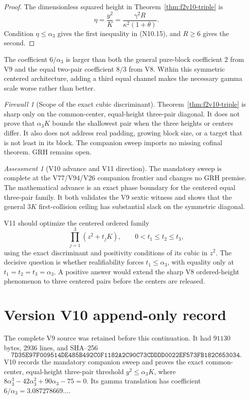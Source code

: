 \documentclass[11pt]{article}
\theoremstyle{definition}
\theoremstyle{remark}
\newtheorem{assessment}[theorem]{Assessment}
\newtheorem{firewall}[theorem]{Firewall}
\begin{document}
\begin{proof}
The dimensionless squared height in Theorem~\ref{thm:f2v10-triple} is
\[
 \eta=\frac{y^2}{K}
 =\frac{\gamma^2R}{\kappa^2(1+\theta)}.
 \tag{N10.17}
\]
Condition \(\eta\le\alpha_3\) gives the first inequality in
\textup{(N10.15)}, and \(R\ge6\) gives the second.
\end{proof}

The coefficient \(6/\alpha_3\) is larger than both the general pure-block
coefficient \(2\) from V9 and the equal two-pair coefficient \(8/3\) from
V8.  Within this symmetric centered architecture, adding a third equal
channel makes the necessary gamma scale worse rather than better.

\begin{firewall}[Scope of the exact cubic discriminant]
Theorem~\ref{thm:f2v10-triple} is sharp only on the common-center,
equal-height three-pair diagonal.  It does not prove that
\(\alpha_3K\) bounds the shallowest pair when the three heights or centers
differ.  It also does not address real padding, growing block size, or a
target that is not least in its block.  The companion sweep imports no
missing cofinal theorem.  GRH remains open.
\end{firewall}

\begin{assessment}[V10 advance and V11 direction]
The mandatory sweep is complete at the V77/V94/V26 companion frontier and
changes no GRH premise.  The mathematical advance is an exact phase
boundary for the centered equal three-pair family.  It both validates the
V9 sextic witness and shows that the general \(3K\) first-collision ceiling
has substantial slack on the symmetric diagonal.

V11 should optimize the centered ordered family
\[
 \prod_{j=1}^3(z^2+t_jK),
 \qquad 0<t_1\le t_2\le t_3,
 \tag{N10.18}
\]
using the exact discriminant and positivity conditions of its cubic in
\(z^2\).  The decisive question is whether realifiability forces
\(t_1\le\alpha_3\), with equality only at
\(t_1=t_2=t_3=\alpha_3\).  A positive answer would extend the sharp V8
ordered-height phenomenon to three centered pairs before the centers are
released.
\end{assessment}

\section*{Version V10 append-only record}
The complete V9 source was retained before this continuation.  It had
\(91130\) bytes, \(2936\) lines, and SHA--256
\[
 \texttt{7D35E97F009514DE485B492C0F1182A2C90C73CDDDD0022EF573FB182C653034}.
\]
V10 records the mandatory companion sweep and proves the exact
common-center, equal-height three-pair threshold
\(y^2\le\alpha_3K\), where
\(8\alpha_3^3-42\alpha_3^2+90\alpha_3-75=0\).  Its gamma translation has
coefficient \(6/\alpha_3=3.087278669\ldots\).
\end{document}

